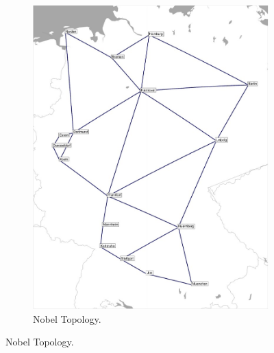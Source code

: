 \noindent
\begin{figure}
    \centering
    \begin{subfigure}{0.475\textwidth}
        \includegraphics[width=\textwidth]{figs/methodology/nobel-germany.jpg}
        \caption{Nobel Topology.}
    \end{subfigure}
    

\end{figure}
